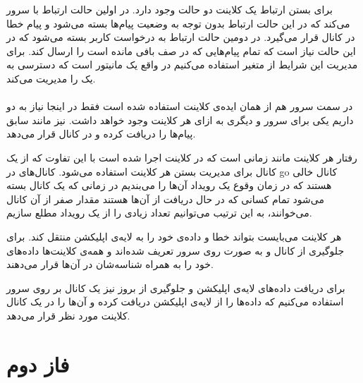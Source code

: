 \documentclass[paper=a4, fontsize=11pt]{article}
\numberwithin{equation}{section} %
\numberwithin{figure}{section} %
\numberwithin{table}{section} %
\begin{document}
برای بستن ارتباط یک کلاینت دو حالت وجود دارد. در اولین حالت
ارتباط با سرور  می‌کند که در این حالت
ارتباط بدون توجه به وضعیت پیام‌ها بسته می‌شود و پیام خطا در
کانال  قرار می‌گیرد.
در دومین حالت ارتباط به درخواست کاربر بسته می‌شود که در این حالت
نیاز است که 
تمام پیام‌هایی که در صف بافی مانده است را ارسال کند.
برای مدیریت این شرایط از متغیر  استفاده می‌کنیم
در واقع یک مانیتور است که دسترسی به یک 
را مدیریت می‌کند.

\paragraph{}
در سمت سرور هم از همان ایده‌ی کلاینت استفاده شده است فقط در اینجا
نیاز به دو 
داریم یکی برای سرور و دیگری به ازای هر کلاینت وجود خواهد داشت.
 نیز مانند سابق پیام‌ها را دریافت کرده
و در کانال  قرار می‌دهد.

رفتار  هر کلاینت مانند زمانی است که در کلاینت اجرا شده است
با این تفاوت که از یک کانال  برای مدیریت بستن هر کلاینت استفاده می‌شود.
کانال‌های  در go کانال خالی هستند که در زمان وقوع یک رویداد آن‌ها را می‌بندیم
در زمانی که یک کانال بسته می‌شود تمام کسانی که در حال دریافت از آن‌ها هستند مقدار صفر از آن کانال می‌خوانند،
به این ترتیب می‌توانیم تعداد زیادی  را از یک رویداد مطلع سازیم.

هر کلاینت می‌بایست بتواند خطا و داده‌ی خود را به لایه‌ی اپلیکشن منتقل کند. برای جلوگیری از
کانال  و 
به صورت 
روی سرور تعریف شده‌اند و همه‌ی کلاینت‌ها داده‌های خود را به همراه شناسه‌شان در آن‌ها قرار می‌دهند.

برای دریافت داده‌های لایه‌ی اپلیکشن و جلوگیری از بروز
نیز یک کانال  بر روی سرور استفاده می‌کنیم
که داده‌ها را از لایه‌ی اپلیکشن دریافت کرده و آن‌ها را در یک کانال
کلاینت مورد نظر قرار می‌دهد.

\section{فاز دوم}
\end{document}
